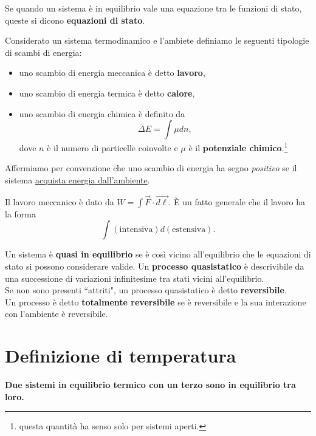 \begin{definition}
Se quando un sistema \`e in equilibrio vale una equazione tra le funzioni di stato, queste si dicono \textbf{equazioni di stato}.
\end{definition}

\begin{definition}
Considerato un sistema termodinamico e l'ambiete definiamo le seguenti tipologie di scambi di energia:
\begin{itemize}
\item uno scambio di energia meccanica \`e detto \textbf{lavoro},
\item uno scambio di energia termica \`e detto \textbf{calore},
\item uno scambio di energia chimica \`e definito da \[\Delta E=\int \mu dn,\] dove $n$ \`e il numero di particelle coinvolte e $\mu$ \`e il \textbf{potenziale chimico}.\footnote{questa quantit\`a ha senso solo per sistemi aperti.}
\end{itemize}
Affermiamo per convenzione che uno scambio di energia ha segno \textit{positivo} se il sistema \underline{acquista energia dall'ambiente}.
\end{definition}

\begin{remark}
Il lavoro meccanico \`e dato da $W=\int \vec F\cdot \vec{d\ell}$. \`E un fatto generale che il lavoro ha la forma
\[\int(\text{intensiva})d(\text{estensiva}).\]
\end{remark}



\begin{definition}
Un sistema \`e \textbf{quasi in equilibrio} se \`e cos\`i vicino all'equilibrio che le equazioni di stato si possono considerare valide. Un \textbf{processo quasistatico} \`e descrivibile da una successione di variazioni infinitesime tra stati vicini all'equilibrio.\\
Se non sono presenti ``attriti", un processo quasistatico \`e detto \textbf{reversibile}.\\
Un processo \`e detto \textbf{totalmente reversibile} se \`e reversibile e la sua interazione con l'ambiente \`e reversibile.
\end{definition}

\section{Definizione di temperatura}
\begin{fact}
\textbf{Due sistemi in equilibrio termico con un terzo sono in equilibrio tra loro.}
\end{fact}

